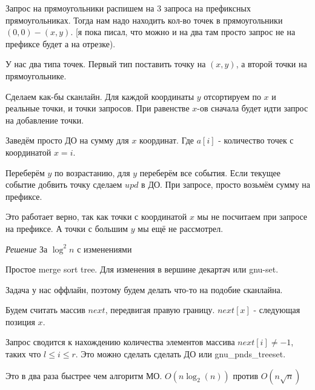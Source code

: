 Запрос на прямоугольники распишем на $3$ запроса на префиксных прямоугольниках. Тогда нам надо находить кол-во точек в прямоугольники $(0, 0)-(x, y)$. [я пока писал, что можно и на два там просто запрос не на префиксе будет а на отрезке).

У нас два типа точек. Первый тип поставить точку на $(x, y)$, а второй точки на прямоугольнике.

Сделаем как-бы сканлайн. Для каждой координаты $y$ отсортируем по $x$ и реальные точки, и точки запросов. При равенстве $x$-ов сначала будет идти запрос на добавление точки.

Заведём просто ДО на сумму для $x$ координат. Где $a[i]$ - количество точек с координатой $x=i$.

Переберём $y$ по возрастанию, для $y$ переберём все события. Если текущее событие добвить точку сделаем $upd$ в ДО. При запросе, просто возьмём сумму на префиксе.

Это работает верно, так как точки с координатой $x$ мы не посчитаем при запросе на префиксе.
А точки с большим $y$ мы ещё не рассмотрел.

{\it Решение } За $\log^2 n$ с изменениями

Простое merge sort tree. Для изменения в вершине декартач или gnu-set.



Задача у нас оффлайн, поэтому будем делать что-то на подобие сканлайна.

Будем считать массив $next$, передвигая правую границу. $next[x]$ - следующая позиция $x$.

Запрос сводится к нахождению количества элементов массива $next[i] \ne -1$, таких что $l \le i \le r$. Это можно сделать сделать ДО или gnu\_pnds\_treeset.

Это в два раза быстрее чем алгоритм МО. $O(n \log_2(n))$ против $O(n \sqrt n)$

